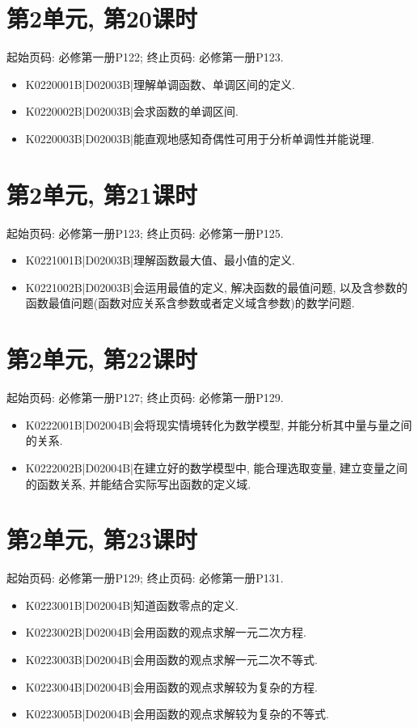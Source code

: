 \section*{第2单元, 第20课时}
起始页码: 必修第一册P122; 终止页码: 必修第一册P123.
\begin{itemize}
\item K0220001B|D02003B|理解单调函数、单调区间的定义.
\item K0220002B|D02003B|会求函数的单调区间.
\item K0220003B|D02003B|能直观地感知奇偶性可用于分析单调性并能说理.
\end{itemize}

\section*{第2单元, 第21课时}
起始页码: 必修第一册P123; 终止页码: 必修第一册P125.
\begin{itemize}
\item K0221001B|D02003B|理解函数最大值、最小值的定义.
\item K0221002B|D02003B|会运用最值的定义, 解决函数的最值问题, 以及含参数的函数最值问题(函数对应关系含参数或者定义域含参数)的数学问题.
\end{itemize}

\section*{第2单元, 第22课时}
起始页码: 必修第一册P127; 终止页码: 必修第一册P129.
\begin{itemize}
\item K0222001B|D02004B|会将现实情境转化为数学模型, 并能分析其中量与量之间的关系.
\item K0222002B|D02004B|在建立好的数学模型中, 能合理选取变量, 建立变量之间的函数关系, 并能结合实际写出函数的定义域.
\end{itemize}

\section*{第2单元, 第23课时}
起始页码: 必修第一册P129; 终止页码: 必修第一册P131.
\begin{itemize}
\item K0223001B|D02004B|知道函数零点的定义.
\item K0223002B|D02004B|会用函数的观点求解一元二次方程.
\item K0223003B|D02004B|会用函数的观点求解一元二次不等式.
\item K0223004B|D02004B|会用函数的观点求解较为复杂的方程.
\item K0223005B|D02004B|会用函数的观点求解较为复杂的不等式.
\end{itemize}

